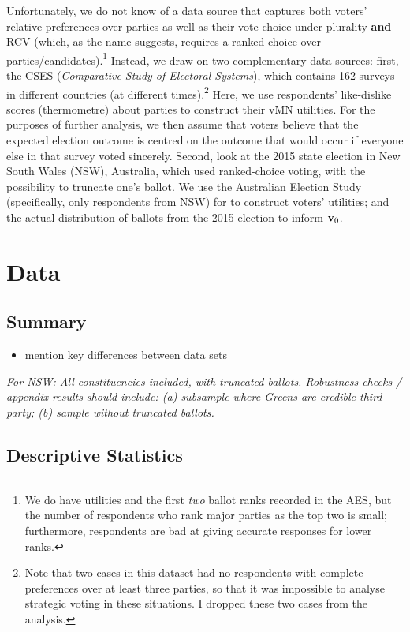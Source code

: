 \documentclass[11pt, letter, margin = 2 in]{article}
\begin{document}
Unfortunately, we do not know of a data source that captures both voters' relative preferences over parties as well as their vote choice under plurality \textbf{and} RCV (which, as the name suggests, requires a ranked choice over parties/candidates).\footnote{We do have utilities and the first \textit{two} ballot ranks recorded in the AES, but the number of respondents who rank major parties as the top two is small; furthermore, respondents are bad at giving accurate responses for lower ranks.} Instead, we draw on two complementary data sources: first, the CSES (\textit{Comparative Study of Electoral Systems}), which contains 162 surveys in different countries (at different times).\footnote{Note that two cases in this dataset had no respondents with complete preferences over at least three parties, so that it was impossible to analyse strategic voting in these situations. I dropped these two cases from the analysis.} Here, we use respondents' like-dislike scores (thermometre) about parties to construct their vMN utilities. For the purposes of further analysis, we then assume that voters believe that the expected election outcome is centred on the outcome that would occur if everyone else in that survey voted sincerely. Second, look at the 2015 state election in New South Wales (NSW), Australia, which used ranked-choice voting, with the possibility to truncate one's ballot. We use the Australian Election Study (specifically, only respondents from NSW) for to construct voters' utilities; and the actual distribution of ballots from the 2015 election to inform ${\bf v}_0$.

\section{Data}

\subsection{Summary}

\begin{itemize}
	\item mention key differences between data sets
\end{itemize}

\textit{For NSW: All constituencies included, with truncated ballots. Robustness checks / appendix results should include: (a) subsample where Greens are credible third party; (b) sample without truncated ballots.}

\subsection{Descriptive Statistics}
\end{document}
